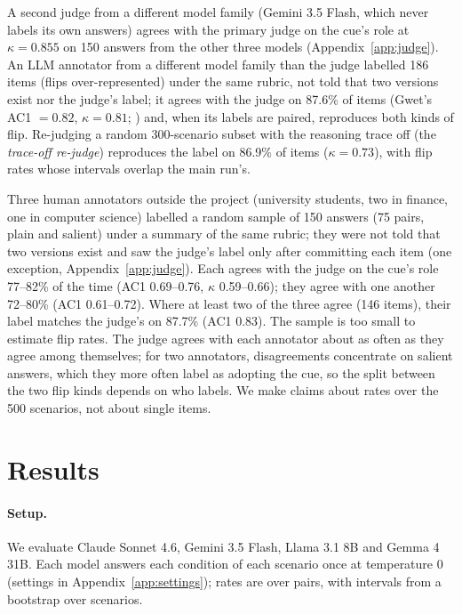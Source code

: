 \documentclass[11pt]{article}
\begin{document}
A second judge from a different model family (Gemini 3.5 Flash, which never labels its own answers)
agrees with the primary judge on the cue's role at $\kappa=0.855$ on 150 answers from the other three
models (Appendix~\ref{app:judge}). An LLM annotator from a different model family than the judge
labelled 186 items (flips over-represented) under the same rubric, not told that two versions exist nor
the judge's label; it agrees with the judge on 87.6\% of items (Gwet's AC1 $=0.82$, $\kappa=0.81$;
\citealp{gwet2008ac1}) and, when its labels are paired, reproduces both kinds of flip. Re-judging a
random 300-scenario subset with the reasoning trace off (the \emph{trace-off re-judge}) reproduces the
label on 86.9\% of items ($\kappa=0.73$), with flip rates whose intervals overlap the main run's.

Three human annotators outside the project (university students, two in finance, one in computer
science) labelled a random sample of 150 answers (75 pairs, plain and salient) under a summary of the
same rubric; they were not told that two versions exist and saw the judge's label only after committing
each item (one exception, Appendix~\ref{app:judge}). Each agrees with the judge on the cue's role
77--82\% of the time (AC1 0.69--0.76, $\kappa$ 0.59--0.66); they agree with one another 72--80\% (AC1
0.61--0.72). Where at least two of the three agree (146 items), their label matches the judge's on 87.7\%
(AC1 0.83). The sample is too small to estimate flip rates. The judge agrees with each annotator about as
often as they agree among themselves; for two annotators, disagreements concentrate on salient answers,
which they more often label as adopting the cue, so the split between the two flip kinds depends on who
labels. We make claims about rates over the 500 scenarios, not about single items.

\section{Results}
\label{sec:results}

\paragraph{Setup.}
We evaluate Claude Sonnet 4.6, Gemini 3.5 Flash, Llama 3.1 8B and Gemma 4 31B. Each model answers each
condition of each scenario once at temperature 0 (settings in Appendix~\ref{app:settings}); rates are
over pairs, with intervals from a bootstrap over scenarios.
\end{document}
